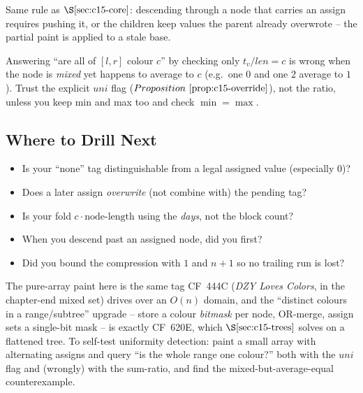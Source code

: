 \begin{warningbox}
Same rule as \(\secref{c15-core}\): descending through a node that carries an assign requires pushing it, or the children keep values the parent already overwrote -- the partial paint is applied to a stale base.
\end{warningbox}

\begin{warningbox}
Answering ``are all of \([l,r]\) colour \(c\)'' by checking only \(t_v/\mathit{len}=c\) is wrong when the node is \emph{mixed} yet happens to average to \(c\) (e.g.\ one \(0\) and one \(2\) average to \(1\)).  Trust the explicit \(\mathit{uni}\) flag (\(\propref{c15-override}\)), not the ratio, unless you keep min and max too and check \(\min=\max\).
\end{warningbox}

\subsection{Where to Drill Next}

\begin{stuckbox}
\begin{itemize}[nosep,leftmargin=1.4em]
  \item Is your ``none'' tag distinguishable from a legal assigned value (especially \(0\))?
  \item Does a later assign \emph{overwrite} (not combine with) the pending tag?
  \item Is your fold \(c\cdot\text{node-length}\) using the \emph{days}, not the block count?
  \item When you descend past an assigned node, did you  first?
  \item Did you bound the compression with \(1\) and \(n+1\) so no trailing run is lost?
\end{itemize}
\end{stuckbox}

The pure-array paint here is the same tag CF~444C (\emph{DZY Loves Colors}, in the chapter-end mixed set) drives over an \(O(n)\) domain, and the ``distinct colours in a range/subtree'' upgrade -- store a colour \emph{bitmask} per node, OR-merge, assign sets a single-bit mask -- is exactly CF~620E, which \(\secref{c15-trees}\) solves on a flattened tree.  To self-test uniformity detection: paint a small array with alternating assigns and query ``is the whole range one colour?'' both with the \(\mathit{uni}\) flag and (wrongly) with the sum-ratio, and find the mixed-but-average-equal counterexample.

